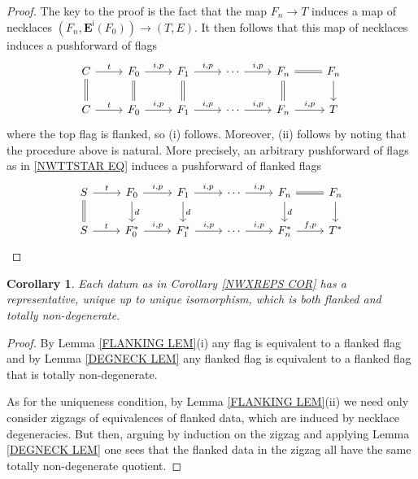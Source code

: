 \documentclass[a4paper,10pt
,draft
]{article}%
\numberwithin{equation}{section}
\numberwithin{figure}{section}
\newtheorem{corollary}[equation]{Corollary}%
\theoremstyle{definition} %
\newcommand{\1}{\ensuremath{\mathbbm 1}}%
\begin{document}
\begin{proof}
	The key to the proof is the fact that 
	the map $F_n \to T$
	induces a map of necklaces
	$(F_n,\boldsymbol{E}^{\mathsf{i}}(F_0)) \to (T,E)$.
	It then follows that this map of necklaces induces a pushforward of flags
\begin{equation}
\begin{tikzcd}
	C \ar{r}{t} \ar[equal]{d}
&
	F_0 \ar{r}{i,p} \ar[equal]{d}
&
	F_1 \ar{r}{i,p} \ar[equal]{d}
&
	\cdots
	\ar{r}{i,p}
&
	F_n \ar[equal]{r} \ar[equal]{d}
&
	F_n \ar{d}
\\
	C \ar{r}{t}
&
	F_0 \ar{r}{i,p}
&
	F_1 \ar{r}{i,p}
&
	\cdots
	\ar{r}{i,p}
&
	F_n \ar{r}{i,p}
&
	T
\end{tikzcd}
\end{equation}	
where the top flag is flanked, so (i) follows.
Moreover, (ii) follows by noting that the procedure above is natural.
More precisely, 
an arbitrary pushforward of flags as in 
\eqref{NWTTSTAR EQ}
induces a pushforward of flanked flags
\begin{equation}
\begin{tikzcd}
	S \ar{r}{t} \ar[equal]{d}
&
	F_0 \ar{r}{i,p} \ar{d}{d}
&
	F_1 \ar{r}{i,p} \ar{d}{d}
&
	\cdots \ar{r}{i,p}
&
	F_n \ar[equal]{r} \ar{d}{d}
&
	F_n \ar{d}
\\
	S \ar{r}{t} 
&
	F^{\**}_0 \ar{r}{i,p}
&
	F^{\**}_1 \ar{r}{i,p}
&
	\cdots \ar{r}{i,p}
&
	F^{\**}_n \ar{r}{f,p}
&
	T^{\**}
\end{tikzcd}
\end{equation}
\end{proof}



\begin{corollary}
	Each datum as in Corollary \ref{NWXREPS COR}
	has a representative, unique up to unique isomorphism,
	which is both flanked and totally non-degenerate.
\end{corollary}



\begin{proof}
	By Lemma \ref{FLANKING LEM}(i)
	any flag is equivalent to a flanked flag
	and by Lemma \ref{DEGNECK LEM}
	any flanked flag is equivalent to a flanked flag that is
	totally non-degenerate.
	
	As for the uniqueness condition, 
	by Lemma \ref{FLANKING LEM}(ii)
	we need only consider zigzags of 
	equivalences of flanked data, 
	which are induced by necklace degeneracies.
	But then, arguing by induction on the zigzag
	and applying 
	Lemma \ref{DEGNECK LEM}
	one sees that the flanked data in the zigzag all have the same
	totally non-degenerate quotient.
\end{proof}
\end{document}
